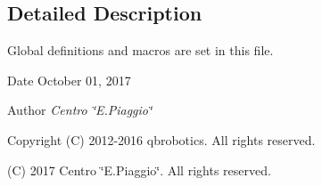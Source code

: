 \subsection{Detailed Description}
Global definitions and macros are set in this file. 

\begin{DoxyDate}{Date}
October 01, 2017 
\end{DoxyDate}
\begin{DoxyAuthor}{Author}
{\itshape Centro \char`\"{}\+E.\+Piaggio\char`\"{}} 
\end{DoxyAuthor}
\begin{DoxyCopyright}{Copyright}
(C) 2012-\/2016 qbrobotics. All rights reserved. 

(C) 2017 Centro \char`\"{}\+E.\+Piaggio\char`\"{}. All rights reserved. 
\end{DoxyCopyright}

